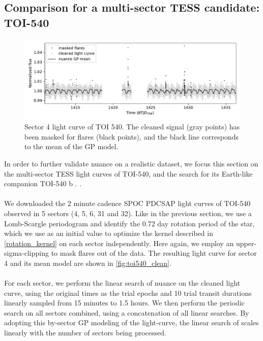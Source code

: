 \documentclass[modern]{aastex631}
\begin{document}
\subsection{Comparison for a multi-sector TESS candidate: TOI-540}\label{toi540}
\begin{figure}[H]
    \begin{centering}
        \includegraphics[width=\linewidth]{./TOI_540/4.pdf}
        \caption{Sector 4 light curve of TOI 540. The cleaned signal (gray points) has been masked for flares (black points), and the black line corresponds to the mean of the GP model. }
        \label{fig:toi540_clean}
    \end{centering}
\end{figure}
In order to further validate nuance on a realistic dataset, we focus this section on the multi-sector TESS light curves of TOI-540, and the search for its Earth-like companion TOI-540 b \citep{TOI540}. .\\\\
We downloaded the 2 minute cadence SPOC PDCSAP light curves of TOI-540 observed in 5 sectors (4, 5, 6, 31 and 32). Like in the previous section, we use a Lomb-Scargle periodogram and identify the 0.72 day rotation period of the star, which we use as an initial value to optimize the kernel described in \autoref{rotation_kernel} on each sector independently. Here again, we employ an upper-sigma-clipping to mask flares out of the data. The resulting light curve for sector 4 and its mean model are shown in \autoref{fig:toi540_clean}.\\\\
For each sector, we perform the linear search of nuance on the cleaned light curve, using the original times as the trial epochs and 10 trial transit durations linearly sampled from 15 minutes to 1.5 hours. We then perform the periodic search on all sectors combined, using a concatenation of all linear searches. By adopting this by-sector GP modeling of the light-curve, the linear search of \nuance{} scales linearly with the number of sectors being processed.
\end{document}
